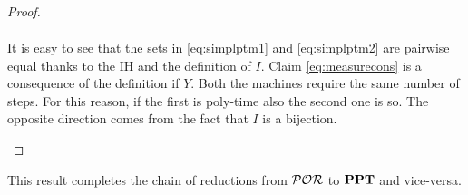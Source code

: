 \begin{proof}
\begin{itemize}
\begin{equation}
\begin{gathered}
\end{gathered}
\end{equation}
\noindent
It is easy to see that the sets in \eqref{eq:simplptm1} and \eqref{eq:simplptm2} are pairwise equal thanks to the IH and the definition of $I$.
%
Claim \eqref{eq:measurecons} is a consequence of the definition if $Y$.
\noindent
Both the machines require the same number of steps. For this reason, if the first is poly-time also the second one is so.
The opposite direction comes from the fact that $I$ is a bijection.
\begin{comment}, so that we can say that $\forall N \in SM\exists M' \in PTM. I^{-1}(M') = N$, so:

\[
\{\omega \in \Os| I^{-1}(M')(\sigma, \omega)= \tau\} = \{\omega \in \Os| Y_{I(I^{-1}(M')),\sigma} (\omega) = \tau\}= \{\omega \in \Os| Y_{M',\sigma} (\omega) = \tau\}
\]
\end{comment}
\begin{comment}
\item[0] In this case the $\TT$ function doesn't contain any matching transition for the initial configuration for neither of the possible outputs on the oracle tape, in this case the output is $\sigma$. This means that both $\Delta_0(\TT)$ and $\Delta_1(\TT)$ are undefined for the initial configuration, so $X^{I(N)}_1$ is undefined for all $\omega \in \Os$. This means that $Y^{I(N)}_0=Y^{I(N)}_1$ and that $\forall \omega \in \Os. Y_{I(N),\sigma} (\omega) =\sigma$.
\begin{align*}
\{\omega \in \Os| N(\sigma)= \sigma\} &= \Os \\
                                          &= \Os =\{\omega \in \Os| Y_{I(N),\sigma} (\omega) =\sigma\}
\end{align*}

For each other value of $\tau$ both the sides of the equivalence \eqref{eq:measure} are $0$. Both the computations took exactly 0 steps.
\end{comment}
\end{itemize}
\end{proof}

This result completes the chain of reductions from $\mathcal{POR}$ to $\mathbf{PPT}$ and vice-versa.






























